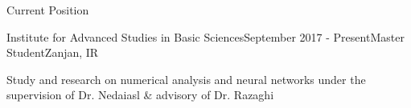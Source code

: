 \documentclass{resume} %
\begin{document}
\begin{rSection}{Current Position}

	\begin{rSubsection}{Institute for Advanced Studies in Basic Sciences}{September 2017 - Present}{Master Student}{Zanjan, IR}
		\item Study and research on numerical analysis and neural networks under the supervision of Dr. Nedaiasl \& advisory of Dr. Razaghi
	\end{rSubsection}	
	
\end{rSection}
\end{document}
